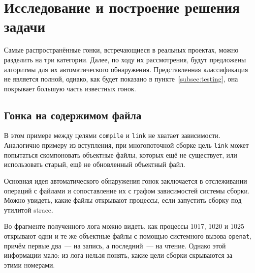 \section{Исследование и построение решения задачи}
\label{sec:Chapter3} 


Самые распространённые гонки, встречающиеся в реальных проектах, можно разделить на три категории. Далее, по ходу их рассмотрения, будут предложены алгоритмы для их автоматического обнаружения. Представленная классификация не является полной, однако, как будет показано в пункте~\ref{subsec:testing}, она покрывает большую часть известных гонок.

\subsection{Гонка на содержимом файла}
\label{subsec:file-content-races}



В этом примере между целями \texttt{compile} и \texttt{link} не хватает зависимости. Аналогично примеру из вступления, при многопоточной сборке цель \texttt{link} может попытаться скомпоновать объектные файлы, которых ещё не существует, или использовать старый, ещё не обновленный объектный файл.

Основная идея автоматического обнаружения гонок заключается в отслеживании операций с файлами и сопоставление их с графом зависимостей системы сборки. Можно увидеть, какие файлы открывают процессы, если запустить сборку под утилитой strace.



Во фрагменте полученного лога можно видеть, как процессы 1017, 1020 и 1025 открывают одни и те же объектные файлы с помощью системного вызова \texttt{openat}, причём первые два~--- на запись, а последний~--- на чтение. Однако этой информации мало: из лога нельзя понять, какие цели сборки скрываются за этими номерами.

